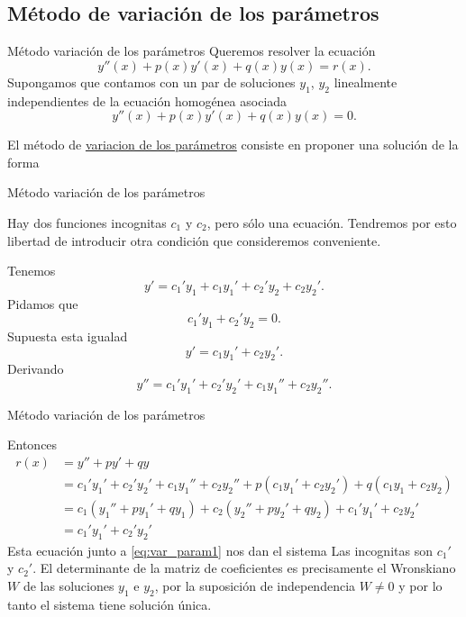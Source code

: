 \documentclass[handout,hyperref={colorlinks=true}]{beamer}
\begin{document}
\subsection{Método de variación de los parámetros}

\begin{frame}{Método variación de los parámetros}
Queremos resolver la ecuación
\begin{equation}\label{eq:2orden_gen}
  y''(x)+p(x)y'(x)+q(x)y(x)=r(x).
\end{equation}
Supongamos que contamos con un par de soluciones $y_1$, $y_2$ linealmente independientes de la ecuación homogénea asociada 
\begin{equation}\label{eq:hom_asoc}
  y''(x)+p(x)y'(x)+q(x)y(x)=0.
\end{equation}

El método de \href{http://en.wikipedia.org/wiki/Variation_of_parameters}{variacion de los parámetros} consiste en proponer una solución de la forma

\end{frame}



\begin{frame}{Método variación de los parámetros}

Hay dos funciones incognitas $c_1$ y $c_2$, pero sólo una ecuación. Tendremos por esto libertad de introducir otra condición que consideremos conveniente.

Tenemos
\[
  y'=c_1'y_1+c_1y_1'+c_2'y_2+c_2y_2'.
\]
Pidamos que
\begin{equation}\label{eq:var_param1}
 c_1'y_1+c_2'y_2=0.
\end{equation}
Supuesta esta igualad
\[ y'= c_1y_1'+c_2y_2'.\]
Derivando
\[ y''= c_1'y_1'+c_2'y_2'+c_1y_1''+c_2y_2''.\]


\end{frame}
\begin{frame}{Método variación de los parámetros}

Entonces
\[
 \begin{split}
    r(x)&=y''+py'+qy\\
    &=c_1'y_1'+c_2'y_2'+c_1y_1''+c_2y_2''+p(c_1y_1'+c_2y_2')+q(c_1y_1+c_2y_2)\\
    &=c_1(y_1''+py_1'+qy_1)+c_2(y_2''+py_2'+qy_2)+c_1'y_1'+c_2y_2'\\
    &=c_1'y_1'+c_2'y_2'
 \end{split}
\]
Esta ecuación junto a \eqref{eq:var_param1} nos dan el sistema
Las incognitas son $c_1'$ y $c_2'$. El determinante de la matriz de coeficientes es precisamente el Wronskiano $W$ de las soluciones $y_1$ e $y_2$, por la suposición
de independencia $W\neq 0$ y por lo tanto el sistema tiene solución única.


\end{frame}
\end{document}
